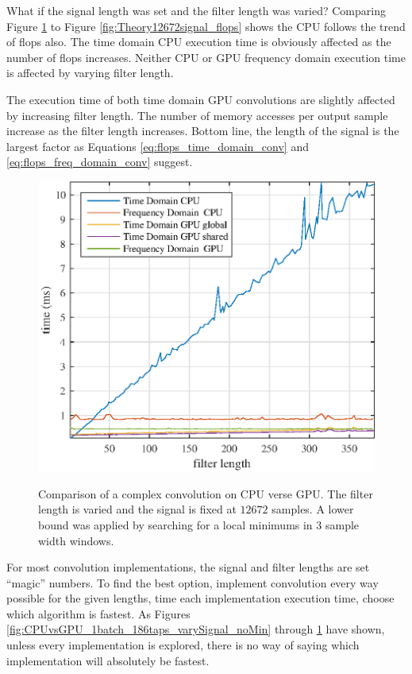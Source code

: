What if the signal length was set and the filter length was varied?
Comparing Figure \ref{fig:CPUvsGPU_1batch_12672signal_varyFilter} to Figure \ref{fig:Theory12672signal_flops} shows the CPU follows the trend of flops also.
The time domain CPU execution time is obviously affected as the number of flops increases.
Neither CPU or GPU frequency domain execution time is affected by varying filter length.

The execution time of both time domain GPU convolutions are slightly affected by increasing filter length.
The number of memory accesses per output sample increase as the filter length increases.
Bottom line, the length of the signal is the largest factor as Equations \ref{eq:flops_time_domain_conv} and \ref{eq:flops_freq_domain_conv} suggest.
\begin{figure}
	\caption{Comparison of a complex convolution on CPU verse GPU. The filter length is varied and the signal is fixed at $12672$ samples. A lower bound was applied by searching for a local minimums in $3$ sample width windows.}
	\centering\includegraphics[width=5in]{figures/gpu_intro/CPUvsGPU_1batch_12672signal_varyFilter.eps}
	\label{fig:CPUvsGPU_1batch_12672signal_varyFilter}
\end{figure}

For most convolution implementations, the signal and filter lengths are set ``magic'' numbers.
To find the best option, implement convolution every way possible for the given lengths, time each implementation execution time, choose which algorithm is fastest.
As Figures \ref{fig:CPUvsGPU_1batch_186taps_varySignal_noMin} through \ref{fig:CPUvsGPU_1batch_12672signal_varyFilter} have shown, unless every implementation is explored, there is no way of saying which implementation will absolutely be fastest.

